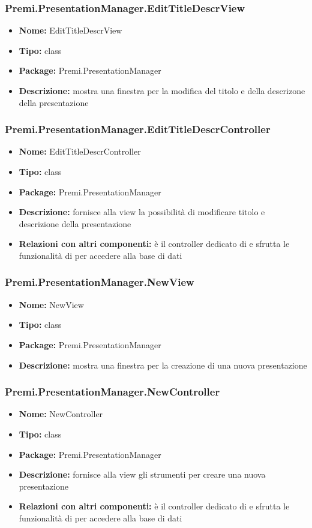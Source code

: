 \subsubsection{Premi.PresentationManager.EditTitleDescrView}
\begin{itemize}
  \item \textbf{Nome:} EditTitleDescrView
  \item \textbf{Tipo:} class
  \item \textbf{Package:} Premi.PresentationManager
  \item \textbf{Descrizione:} mostra una finestra per la modifica del titolo e della descrizone della presentazione
\end{itemize}
\subsubsection{Premi.PresentationManager.EditTitleDescrController}
\begin{itemize}
  \item \textbf{Nome:} EditTitleDescrController
  \item \textbf{Tipo:} class
  \item \textbf{Package:} Premi.PresentationManager
  \item \textbf{Descrizione:} fornisce alla view la possibilità di modificare titolo e descrizione della presentazione
  \item \textbf{Relazioni con altri componenti:} è il controller dedicato di   e sfrutta le funzionalità di  per accedere alla base di dati
\end{itemize}
\subsubsection{Premi.PresentationManager.NewView}
\begin{itemize}
  \item \textbf{Nome:} NewView
  \item \textbf{Tipo:} class
  \item \textbf{Package:} Premi.PresentationManager
  \item \textbf{Descrizione:} mostra una finestra per la creazione di una nuova presentazione
\end{itemize}
\subsubsection{Premi.PresentationManager.NewController}
\begin{itemize}
  \item \textbf{Nome:} NewController
  \item \textbf{Tipo:} class
  \item \textbf{Package:} Premi.PresentationManager
  \item \textbf{Descrizione:} fornisce alla view gli strumenti per creare una nuova presentazione
  \item \textbf{Relazioni con altri componenti:} è il controller dedicato di   e sfrutta le funzionalità di  per accedere alla base di dati
\end{itemize}

